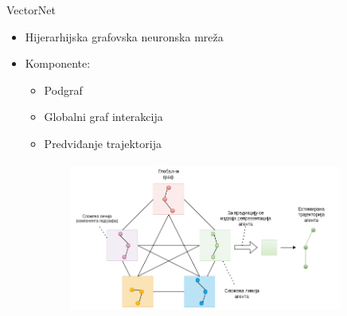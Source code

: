 \documentclass[bookmarks=true,bookmarksopen=true,pdfborder={0 0 0},pdfhighlight={/N},linkbordercolor={.5 .5 .5},implicit=false,unicode,xcolor={table}]{beamer}
\begin{document}
\begin{frame}{VectorNet}
  
  \begin{itemize}
    \item Hijerarhijska grafovska neuronska mreža
    \item Komponente:
      \begin{itemize}
        \item Podgraf
        \item Globalni graf interakcija
        \item Predviđanje trajektorija
      \end{itemize}
  \end{itemize}


  \begin{figure}
    \begin{subfigure}{9cm}
      \includegraphics[width=9cm,height=5cm]{vectornet-overview-Hijearhija.drawio.png}
    \end{subfigure}
  \end{figure}
  \hfill

\end{frame}
\end{document}
